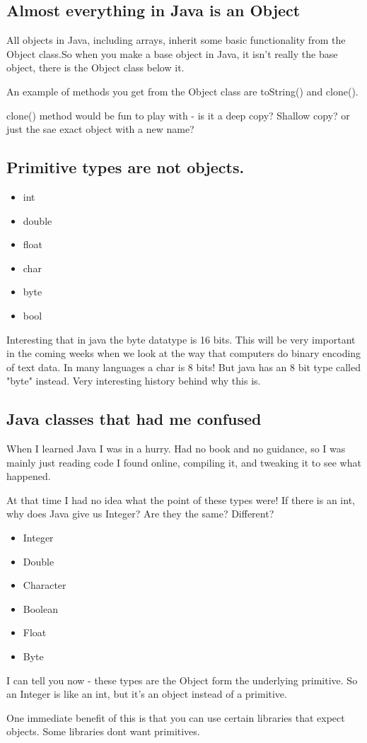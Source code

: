 \documentclass[12pt,a4paper]{article}
\begin{document}
\subsection{Almost everything in Java is an Object}
All objects in Java, including arrays, inherit some basic functionality from the
Object class.So when you make a base object in Java, it isn't really the base
object, there is the Object class below it. 

An example of methods you get from the Object class are toString() and clone().

clone() method would be fun to play with - is it a deep copy? Shallow copy? or
just the sae exact object with a new name?

\subsection{Primitive types are not objects.}
\begin{itemize}
\item int
\item double
\item float
\item char
\item byte
\item bool
\end{itemize}

Interesting that in java the byte datatype is 16 bits. This will be very
important in the coming weeks when we look at the way that computers do binary
encoding of text data. In many languages a char is 8 bits! But java has an 8
bit type called "byte" instead. Very interesting history behind why this is.

\subsection{Java classes that had me confused}
When I learned Java I was in a hurry. Had no book and no guidance, so I was
mainly just reading code I found online, compiling it, and tweaking it to see
what happened.

At that time I had no idea what the point of these types were! If there is an
int, why does Java give us Integer? Are they the same? Different?

\begin{itemize}
\item Integer
\item Double
\item Character
\item Boolean
\item Float
\item Byte
\end{itemize}

I can tell you now - these types are the Object form the underlying primitive.
So an Integer is like an int, but it's an object instead of a primitive. 

One immediate benefit of this is that you can use certain libraries that expect
objects. Some libraries dont want primitives.
\end{document}
